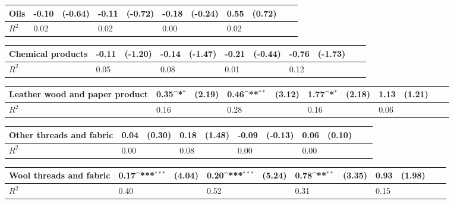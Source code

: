 \def\sym#1{\ifmmode^{#1}\else\(^{#1}\)\fi}
\begin{tabular}{p{4cm} p{1.4cm} p{1.2cm} p{1.5cm}  p{1.5cm} p{1.4cm} p{1.2cm} p{1.5cm} p{1.5cm}  p{1.5cm} p{1.5cm} }
\hline
Oils            &    -0.10         &  (-0.64)&    -0.11         &  (-0.72)&    -0.18         &  (-0.24)&     0.55         &   (0.72)\\
\hline
\(R^{2}\)       &     0.02         &         &     0.02         &         &     0.00         &         &     0.02         &         \\
\end{tabular}
\def\sym#1{\ifmmode^{#1}\else\(^{#1}\)\fi}
\begin{tabular}{p{4cm} p{1.4cm} p{1.2cm} p{1.5cm}  p{1.5cm} p{1.4cm} p{1.2cm} p{1.5cm} p{1.5cm}  p{1.5cm} p{1.5cm} }
\hline
Chemical products&    -0.11         &  (-1.20)&    -0.14         &  (-1.47)&    -0.21         &  (-0.44)&    -0.76         &  (-1.73)\\
\hline
\(R^{2}\)       &     0.05         &         &     0.08         &         &     0.01         &         &     0.12         &         \\
\end{tabular}
\def\sym#1{\ifmmode^{#1}\else\(^{#1}\)\fi}
\begin{tabular}{p{4cm} p{1.4cm} p{1.2cm} p{1.5cm}  p{1.5cm} p{1.4cm} p{1.2cm} p{1.5cm} p{1.5cm}  p{1.5cm} p{1.5cm} }
\hline
Leather wood and paper product&     0.35\sym{*}  &   (2.19)&     0.46\sym{**} &   (3.12)&     1.77\sym{*}  &   (2.18)&     1.13         &   (1.21)\\
\hline
\(R^{2}\)       &     0.16         &         &     0.28         &         &     0.16         &         &     0.06         &         \\
\end{tabular}
\def\sym#1{\ifmmode^{#1}\else\(^{#1}\)\fi}
\begin{tabular}{p{4cm} p{1.4cm} p{1.2cm} p{1.5cm}  p{1.5cm} p{1.4cm} p{1.2cm} p{1.5cm} p{1.5cm}  p{1.5cm} p{1.5cm} }
\hline
Other threads and fabric&     0.04         &   (0.30)&     0.18         &   (1.48)&    -0.09         &  (-0.13)&     0.06         &   (0.10)\\
\hline
\(R^{2}\)       &     0.00         &         &     0.08         &         &     0.00         &         &     0.00         &         \\
\end{tabular}
\def\sym#1{\ifmmode^{#1}\else\(^{#1}\)\fi}
\begin{tabular}{p{4cm} p{1.4cm} p{1.2cm} p{1.5cm}  p{1.5cm} p{1.4cm} p{1.2cm} p{1.5cm} p{1.5cm}  p{1.5cm} p{1.5cm} }
\hline
Wool threads and fabric&     0.17\sym{***}&   (4.04)&     0.20\sym{***}&   (5.24)&     0.78\sym{**} &   (3.35)&     0.93         &   (1.98)\\
\hline
\(R^{2}\)       &     0.40         &         &     0.52         &         &     0.31         &         &     0.15         &         \\
\end{tabular}

